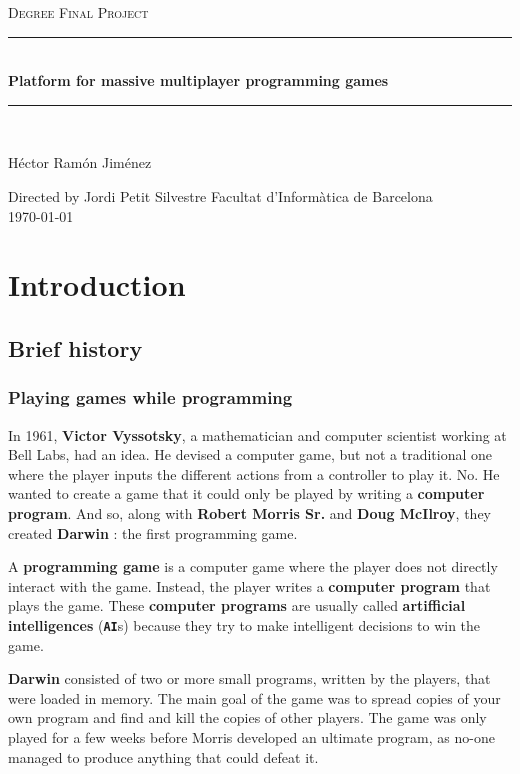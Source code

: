 \documentclass[a4paper,11pt,titlepage,abstract,numbers=noenddot,automark,mnsy,intlimits,rgb,dvipsnames]{report}
\begin{document}
\begin{titlepage}
\begin{center}
\textsc{\Large Degree Final Project}
\\[1.5cm]
\rule{\linewidth}{0.5mm}
\\[0.4cm]
{\huge
\bfseries
Platform for massive multiplayer programming games
\\[0.4cm]
}
\rule{\linewidth}{0.5mm}
\\[2.5cm]
\begin{center}
\large
Héctor Ramón Jiménez
\end{center}
Directed by Jordi Petit Silvestre
\vfill
{\large
Facultat d'Informàtica de Barcelona
}
\\[0.5cm]
{\large
\today
}
\end{center}
\end{titlepage}
\clearpage
\begin{abstract}
...
\end{abstract}
\clearpage
\tableofcontents
\clearpage
\chapter{Introduction}
\section{Brief history}
\subsection{Playing games while programming}
In 1961, \textbf{Victor Vyssotsky}, a mathematician and computer scientist working at Bell Labs, had an idea. He devised
a computer game, but not a traditional one where the player inputs the different actions from a controller to play it.
No. He wanted to create a game that it could only be played by writing a \textbf{computer program}. And so, along with \textbf{Robert
Morris Sr.} and \textbf{Doug McIlroy}, they created \textbf{Darwin} \cite{darwin}: the first programming game.

A \textbf{programming game} is a computer game where the player does not directly interact with the game. Instead, the
player writes a \textbf{computer program} that plays the game. These \textbf{computer programs} are usually called \textbf{artifficial
intelligences} (\textbf{\texttt{AI}}s) because they try to make intelligent decisions to win the game.

\textbf{Darwin} consisted of two or more small programs, written by the players, that were loaded in memory. The main goal
of the game was to spread copies of your own program and find and kill the copies of other players. The game was only
played for a few weeks before Morris developed an ultimate program, as no-one managed to produce anything that could
defeat it.
\end{document}
